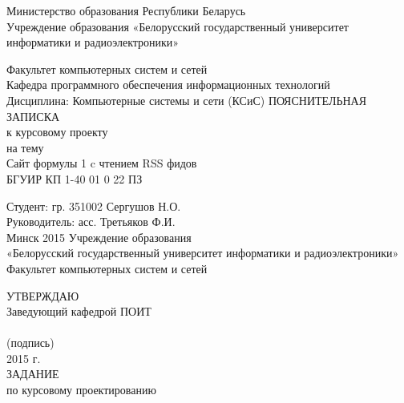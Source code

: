 \documentclass[14pt,a4paper]{extreport}
\title{}
\author{}
\begin{document}
	\center
	Министерство образования Республики Беларусь\\
	Учреждение образования «Белорусский государственный университет информатики и радиоэлектроники»
	\vspace*{2cm}
	\endcenter
	\raggedright
	Факультет компьютерных систем и сетей\\
	\medskip
	Кафедра программного обеспечения информационных технологий\\
	\medskip
	Дисциплина:  Компьютерные системы и сети (КСиС)
	\vspace*{2cm}
	\center
	ПОЯСНИТЕЛЬНАЯ ЗАПИСКА\\
	к курсовому проекту\\
	на тему\\
	\medskip
	Сайт формулы 1 c чтением RSS фидов\\
	\medskip
	БГУИР КП  1-40 01 0 22 ПЗ
	\vspace*{4cm}
	\endcenter
	\raggedright
	\hspace*{7.94cm} Студент: гр. 351002 Сергушов Н.О.\\
	\bigskip
	\hspace*{7.94cm}Руководитель: асс. Третьяков Ф.И.\\
	\center
	\vspace*{7cm}
	Минск 2015
	\pagestyle{empty}
	\newpage
	\center
	Учреждение образования\\
	\medskip
	«Белорусский государственный университет информатики и радиоэлектроники»\\
	\medskip
	Факультет компьютерных систем и сетей\\
	\medskip
	\endcenter
	\raggedright
	\hspace*{9.53cm}УТВЕРЖДАЮ\\
	\hspace*{9.53cm}Заведующий кафедрой ПОИТ\\
	\hspace*{9.53cm}\underline{\hspace{6cm}} \\
	\hspace*{11cm}\small (подпись) \normalsize\\
	\hspace*{9.53cm}\underline{\hspace{5cm}}2015 г.\\
	\medskip
	\center
	ЗАДАНИЕ\\
	по курсовому проектированию\\
	\medskip
\end{document}
